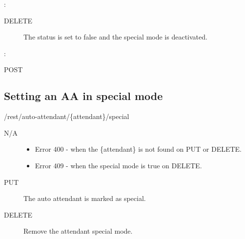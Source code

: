 \documentclass[letterpaper,10pt,english]{sphinxmanual}
\begin{document}
:

\begin{sphinxVerbatim}[commandchars=\\\{\}]
\end{sphinxVerbatim}
\begin{description}
\item[{ DELETE}] \leavevmode
The status is set to false and the special mode is deactivated.

\end{description}

:

\begin{sphinxVerbatim}[commandchars=\\\{\}]
\end{sphinxVerbatim}

 POST


\subsection{Setting an AA in special mode}
\label{\detokenize{restapi:setting-an-aa-in-special-mode}}
 /rest/auto-attendant/\{attendant\}/special

 N/A
\begin{description}
\item[{}] \leavevmode\begin{itemize}
\item {} 
Error 400 - when the \{attendant\} is not found on PUT or DELETE.

\item {} 
Error 409 - when the special mode is true on DELETE.

\end{itemize}

\item[{ PUT}] \leavevmode
The auto attendant is marked as special.

\item[{ DELETE}] \leavevmode
Remove the attendant special mode.

\end{description}
\end{document}
